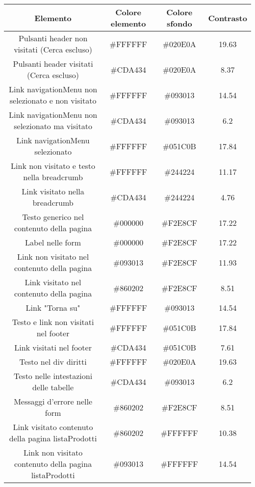 \begin{longtable}{|c|c|c|c|}
\hline
\textbf{Elemento} & \textbf{Colore elemento} & \textbf{Colore sfondo} & \textbf{Contrasto}  \\ \hline

    Pulsanti header non visitati (Cerca escluso) & \#FFFFFF & \#020E0A & 19.63  \\ \hline
    Pulsanti header visitati (Cerca escluso) & \#CDA434 & \#020E0A & 8.37  \\ \hline
    Link navigationMenu non selezionato e non visitato & \#FFFFFF & \#093013 & 14.54  \\ \hline
    Link navigationMenu non selezionato ma visitato & \#CDA434 & \#093013 & 6.2  \\ \hline
    Link navigationMenu selezionato & \#FFFFFF & \#051C0B & 17.84  \\ \hline
    Link non visitato e testo nella breadcrumb & \#FFFFFF & \#244224 & 11.17  \\ \hline
    Link visitato nella breadcrumb & \#CDA434 & \#244224 & 4.76  \\ \hline
    Testo generico nel contenuto della pagina & \#000000 & \#F2E8CF  & 17.22 \\ \hline
    Label nelle form & \#000000 & \#F2E8CF  & 17.22 \\ \hline
    Link non visitato nel contenuto della pagina & \#093013 & \#F2E8CF  & 11.93 \\ \hline
    Link visitato nel contenuto della pagina & \#860202 & \#F2E8CF  & 8.51 \\ \hline
    Link "Torna su" & \#FFFFFF & \#093013 & 14.54  \\ \hline
    Testo e link non visitati nel footer & \#FFFFFF & \#051C0B & 17.84 \\ \hline
    Link visitati nel footer & \#CDA434 & \#051C0B & 7.61 \\ \hline
    Testo nel div diritti & \#FFFFFF & \#020E0A & 19.63 \\ \hline
    Testo nelle intestazioni delle tabelle & \#CDA434 & \#093013 & 6.2  \\ \hline
    Messaggi d'errore nelle form & \#860202 & \#F2E8CF  & 8.51 \\ \hline
    Link visitato contenuto della pagina listaProdotti & \#860202 & \#FFFFFF & 10.38 \\ \hline
    Link non visitato contenuto della pagina listaProdotti & \#093013 & \#FFFFFF & 14.54 \\ \hline
\end{longtable}

